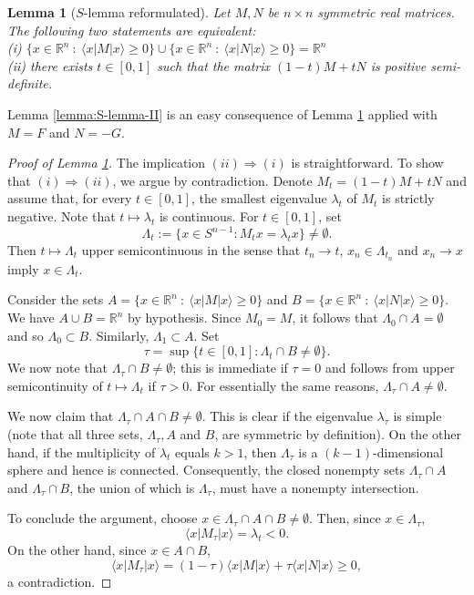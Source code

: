 \documentclass[10pt]{article}
\newcommand{\st}{\ : \ }
\renewcommand{\geq}{\geqslant}
\newcommand{\R}{\mathbb{R}}
\newcommand{\bra}[1]{\langle #1 |}
\newcommand{\ket}[1]{| #1 \rangle}
\theoremstyle{plain}
\newtheorem{lemma}[theorem]{Lemma}
\theoremstyle{definition}
\theoremstyle{remark}
\begin{document}
\begin{lemma}[$S$-lemma reformulated] \label{lemma:S-lemma}
Let $M, N$ be $n \times n$ symmetric real matrices. The following two statements are equivalent:\\
(i) $\{ x \in \R^n \st \bra{x} M \ket{x} \geq 0 \} \cup \{ x \in \R^n \st \bra{x} N \ket{x} \geq 0 \} = \R^n$ 
\\ 
(ii) there exists  $t \in [0,1]$ such that the matrix $(1-t)M+t N$ is positive semi-definite.
\end{lemma} 

Lemma \ref{lemma:S-lemma-II} is an easy consequence of Lemma \ref{lemma:S-lemma} applied
with $M=F$ and $N=-G$.


\begin{proof} [Proof of Lemma \ref{lemma:S-lemma}] 
The implication $(ii) \Rightarrow (i)$ is straightforward. 
To show that $(i) \Rightarrow (ii)$, 
we argue by contradiction. 
Denote $M_t = (1-t)M+tN$ and assume that, for every $t \in [0,1]$, the smallest eigenvalue 
$\lambda_t$ of $M_t$ is strictly negative. Note that $t \mapsto \lambda_t$ is continuous. 
For $t\in [0,1]$, set 
\[
\Lambda_t := \{ x \in S^{n-1} : M_tx = \lambda_t x\} \neq \emptyset . 
\]
Then  $t \mapsto \Lambda_t$ upper semicontinuous in the sense that $t_n \to t$, 
$x_n \in \Lambda_{t_n}$ and $x_n \to x$ imply $x\in \Lambda_t$. 

Consider the sets $A = \{ x \in \R^n \st \bra{x} M \ket{x} \geq 0\}$ and 
$B = \{ x \in \R^n \st \bra{x} N \ket{x} \geq 0 \}$. We have $A \cup B = \R^n$ by hypothesis.
Since $M_0=M$, it follows that $\Lambda_0 \cap A=\emptyset$ and so  $\Lambda_0 \subset B$. 
Similarly, $\Lambda_1 \subset A$. 
Set 
\[
\tau = \sup \{t \in [0,1] : \Lambda_t \cap B \neq \emptyset \}. 
\]
We now note that $\Lambda_\tau  \cap B \neq \emptyset$; this is immediate if  $\tau=0$ and follows from 
upper semicontinuity of $t \mapsto \Lambda_t$ if $\tau >0$. 
For essentially the same reasons, $\Lambda_\tau  \cap A \neq \emptyset$. 

We now claim that $\Lambda_\tau  \cap A \cap B \neq \emptyset$. This is clear if the eigenvalue $\lambda_\tau$ 
is simple (note that all three sets, $\Lambda_\tau,  A$ and $B$, are symmetric by definition). On the other hand, 
if the multiplicity of 
$\lambda_t$ equals $k>1$, then $\Lambda_\tau$ is a $(k-1)$-dimensional sphere and hence is connected. 
Consequently, the closed nonempty sets $\Lambda_\tau  \cap A$ and  $\Lambda_\tau  \cap B$, the union 
of which is $\Lambda_\tau$,  
must have a nonempty intersection. 

To conclude the argument, choose $x \in \Lambda_\tau  \cap A \cap B \neq \emptyset$. 
Then, since $x \in  \Lambda_\tau$,
\[
\bra{x} M_\tau \ket{x} = \lambda_t < 0 .
\] 
On the other hand, since $x \in A \cap B$, 
\[
\bra{x} M_\tau \ket{x} = (1-\tau)\bra{x} M \ket{x} + \tau \bra{x} N \ket{x} \geq 0, 
\]
a contradiction.  
\end{proof} 
\end{document}
